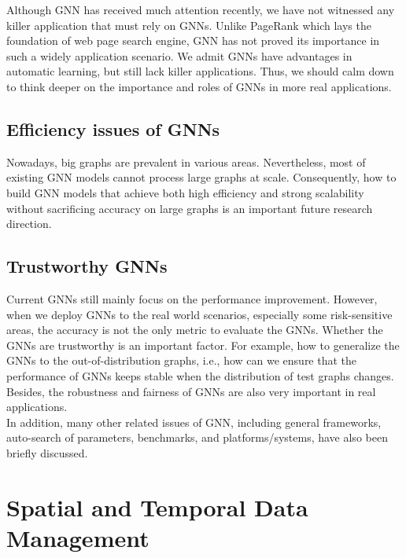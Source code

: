 \documentclass[11pt,dvipdfm]{article}
\begin{document}
Although GNN has received much attention recently, we have not witnessed any killer application that must rely on GNNs. Unlike PageRank which lays the foundation of web page search engine, GNN has not proved its importance in such a widely application scenario. We admit GNNs have advantages in automatic learning, but still lack killer applications. %
Thus, we should calm down to think deeper on the importance and roles of GNNs in more real applications.

\subsection{Efficiency issues of GNNs}

Nowadays, big graphs are prevalent in various areas. Nevertheless, most of existing GNN models cannot process large graphs at scale. Consequently, how to build GNN models that achieve both high efficiency and strong scalability without sacrificing accuracy on large graphs is an important future research direction.

\subsection{Trustworthy GNNs}

Current GNNs still mainly focus on the performance improvement. However, when we deploy GNNs to the real world scenarios, especially some risk-sensitive areas, the accuracy is not the only metric to evaluate the GNNs. Whether the GNNs are trustworthy is an important factor. For example, how to generalize the GNNs to the out-of-distribution graphs, i.e., how can we ensure that the performance of GNNs keeps stable when the distribution of test graphs changes. Besides, the robustness and fairness of GNNs are also very important in real applications.\\


\noindent
In addition, many other related issues of GNN, including general frameworks, auto-search of parameters, benchmarks, and platforms/systems, have also been briefly discussed.


\section{Spatial and Temporal Data Management}
\end{document}

